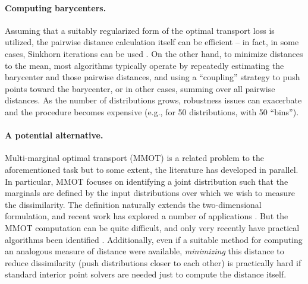 \paragraph{Computing barycenters.}
Assuming that a suitably regularized form of the optimal transport loss is utilized, the pairwise distance 
calculation itself can be efficient -- in fact, 
in some cases, Sinkhorn iterations can be used \citep{cuturi2013sinkhorn}. 
On the other hand, to minimize distances to the mean, 
most algorithms typically operate 
by repeatedly estimating the barycenter and those pairwise distances, and using a ``coupling'' strategy 
to push points toward the barycenter,
or in other cases, summing over all pairwise 
distances. 
As the number of distributions 
grows, robustness issues can exacerbate \citep{alvarez2008trimmed} and the procedure becomes
expensive (e.g., for 50 distributions, with 50 ``bins'').

\paragraph{A potential alternative.}
Multi-marginal optimal transport (MMOT) is a related problem to the aforementioned task but to some extent, the literature has developed in parallel.
In particular, MMOT focuses on identifying a joint distribution such that the marginals are defined by the input distributions over which we wish to measure the dissimilarity.
The definition naturally extends the two-dimensional formulation, and recent work has explored a number of applications \citep{pass2015multi}.
But the MMOT computation can be quite difficult,
and only very recently have practical algorithms been identified \citep{mmotcuturi}.
Additionally, even if a suitable method for computing an analogous measure of distance were available, 
\textit{minimizing} this distance to reduce 
dissimilarity (push distributions closer to each other) is practically hard if standard interior point solvers are needed just to compute the distance itself.

